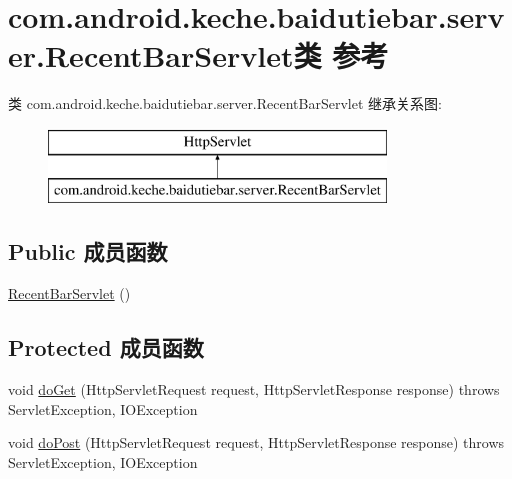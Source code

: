 \hypertarget{classcom_1_1android_1_1keche_1_1baidutiebar_1_1server_1_1_recent_bar_servlet}{}\section{com.\+android.\+keche.\+baidutiebar.\+server.\+Recent\+Bar\+Servlet类 参考}
\label{classcom_1_1android_1_1keche_1_1baidutiebar_1_1server_1_1_recent_bar_servlet}
类 com.\+android.\+keche.\+baidutiebar.\+server.\+Recent\+Bar\+Servlet 继承关系图\+:\begin{figure}[H]
\begin{center}
\leavevmode
\includegraphics[height=2.000000cm]{classcom_1_1android_1_1keche_1_1baidutiebar_1_1server_1_1_recent_bar_servlet}
\end{center}
\end{figure}
\subsection*{Public 成员函数}
\begin{DoxyCompactItemize}
\item 
\mbox{\hyperlink{classcom_1_1android_1_1keche_1_1baidutiebar_1_1server_1_1_recent_bar_servlet_a1cbafb99a23906d69068f53db955898c}{Recent\+Bar\+Servlet}} ()
\end{DoxyCompactItemize}
\subsection*{Protected 成员函数}
\begin{DoxyCompactItemize}
\item 
void \mbox{\hyperlink{classcom_1_1android_1_1keche_1_1baidutiebar_1_1server_1_1_recent_bar_servlet_ae5e224734b12a10aa8f0a0936232c1b8}{do\+Get}} (Http\+Servlet\+Request request, Http\+Servlet\+Response response)  throws Servlet\+Exception, I\+O\+Exception 
\item 
void \mbox{\hyperlink{classcom_1_1android_1_1keche_1_1baidutiebar_1_1server_1_1_recent_bar_servlet_a0cbc22d0c2a7d89228df63a609b2698e}{do\+Post}} (Http\+Servlet\+Request request, Http\+Servlet\+Response response)  throws Servlet\+Exception, I\+O\+Exception 
\end{DoxyCompactItemize}


